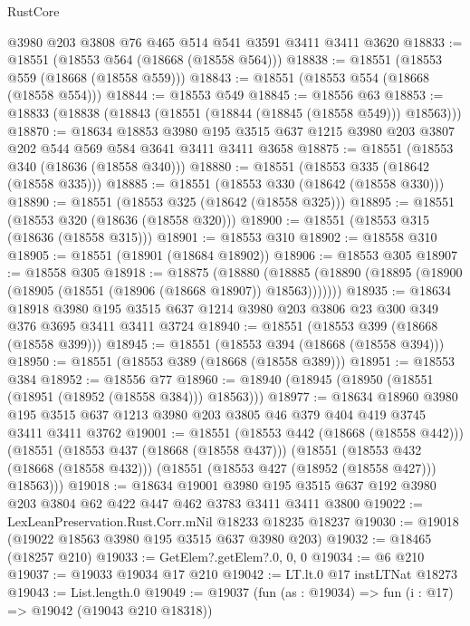 \begin{lexlean}{RustCore}
\begin{coremodule}
    @3980
    @203
    @3808
    @76
    @465
    @514
    @541
    @3591
    @3411
    @3411
    @3620
@18833 := @18551 (@18553 @564 (@18668 (@18558 @564)))
@18838 := @18551 (@18553 @559 (@18668 (@18558 @559)))
@18843 := @18551 (@18553 @554 (@18668 (@18558 @554)))
@18844 := @18553 @549
@18845 := @18556 @63
@18853 := @18833 (@18838 (@18843 (@18551 (@18844 (@18845 (@18558 @549))) @18563)))
@18870 := @18634
    @18853
    @3980
    @195
    @3515
    @637
    @1215
    @3980
    @203
    @3807
    @202
    @544
    @569
    @584
    @3641
    @3411
    @3411
    @3658
@18875 := @18551 (@18553 @340 (@18636 (@18558 @340)))
@18880 := @18551 (@18553 @335 (@18642 (@18558 @335)))
@18885 := @18551 (@18553 @330 (@18642 (@18558 @330)))
@18890 := @18551 (@18553 @325 (@18642 (@18558 @325)))
@18895 := @18551 (@18553 @320 (@18636 (@18558 @320)))
@18900 := @18551 (@18553 @315 (@18636 (@18558 @315)))
@18901 := @18553 @310
@18902 := @18558 @310
@18905 := @18551 (@18901 (@18684 @18902))
@18906 := @18553 @305
@18907 := @18558 @305
@18918 := @18875
    (@18880 (@18885 (@18890 (@18895 (@18900 (@18905 (@18551 (@18906 (@18668 @18907)) @18563)))))))
@18935 := @18634
    @18918
    @3980
    @195
    @3515
    @637
    @1214
    @3980
    @203
    @3806
    @23
    @300
    @349
    @376
    @3695
    @3411
    @3411
    @3724
@18940 := @18551 (@18553 @399 (@18668 (@18558 @399)))
@18945 := @18551 (@18553 @394 (@18668 (@18558 @394)))
@18950 := @18551 (@18553 @389 (@18668 (@18558 @389)))
@18951 := @18553 @384
@18952 := @18556 @77
@18960 := @18940 (@18945 (@18950 (@18551 (@18951 (@18952 (@18558 @384))) @18563)))
@18977 := @18634
    @18960
    @3980
    @195
    @3515
    @637
    @1213
    @3980
    @203
    @3805
    @46
    @379
    @404
    @419
    @3745
    @3411
    @3411
    @3762
@19001 := @18551
    (@18553 @442 (@18668 (@18558 @442)))
    (@18551
      (@18553 @437 (@18668 (@18558 @437)))
      (@18551
        (@18553 @432 (@18668 (@18558 @432)))
        (@18551 (@18553 @427 (@18952 (@18558 @427))) @18563)))
@19018 := @18634
    @19001
    @3980
    @195
    @3515
    @637
    @192
    @3980
    @203
    @3804
    @62
    @422
    @447
    @462
    @3783
    @3411
    @3411
    @3800
@19022 := LexLeanPreservation.Rust.Corr.mNil @18233 @18235 @18237
@19030 := @19018 (@19022 @18563 @3980 @195 @3515 @637 @3980 @203)
@19032 := @18465 (@18257 @210)
@19033 := GetElem?.getElem?.{0, 0, 0}
@19034 := @6 @210
@19037 := @19033 @19034 @17 @210
@19042 := LT.lt.{0} @17 instLTNat @18273
@19043 := List.length.{0}
@19049 := @19037 (fun (as : @19034) => fun (i : @17) => @19042 (@19043 @210 @18318))

\end{coremodule}
\end{lexlean}
